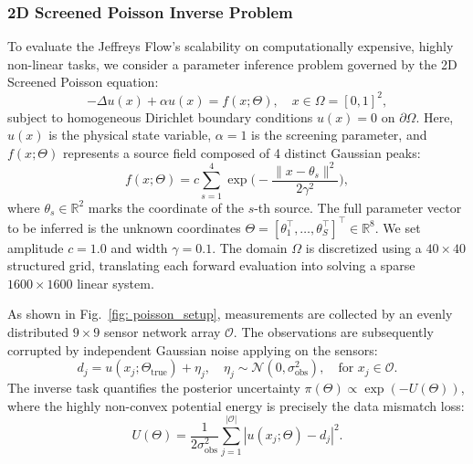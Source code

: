 \documentclass[%
 reprint,
 amsmath,amssymb,
 aps,
 pre,
]{revtex4-2}
\begin{document}
\subsubsection*{2D Screened Poisson Inverse Problem}

To evaluate the Jeffreys Flow's scalability on computationally expensive, highly non-linear tasks, we consider a parameter inference problem governed by the 2D Screened Poisson equation:
\begin{equation*}
	-\Delta u(x) + \alpha u(x) = f(x; \Theta), \quad x \in \Omega = [0, 1]^2,
\end{equation*}
subject to homogeneous Dirichlet boundary conditions $u(x) = 0$ on $\partial\Omega$. Here, $u(x)$ is the physical state variable, $\alpha=1$ is the screening parameter, and $f(x; \Theta)$ represents a source field composed of 4 distinct Gaussian peaks:
\begin{equation*}
	f(x; \Theta) = c \sum_{s=1}^4 \exp \bigg( -\frac{\|x - \theta_s\|^2}{2\gamma^2} \bigg),
\end{equation*}
where $\theta_s \in \mathbb{R}^2$ marks the coordinate of the $s$-th source. The full parameter vector to be inferred is the unknown coordinates $\Theta = [\theta_1^\top, \ldots, \theta_S^\top]^\top \in \mathbb{R}^8$. We set amplitude $c = 1.0$ and width $\gamma = 0.1$. The domain $\Omega$ is discretized using a $40 \times 40$ structured grid, translating each forward evaluation into solving a sparse $1600 \times 1600$ linear system.

As shown in Fig.~\ref{fig: poisson_setup}, measurements are collected by an evenly distributed $9 \times 9$ sensor network array $\mathcal{O}$. The observations are subsequently corrupted by independent Gaussian noise applying on the sensors:
\begin{equation*}
	d_j = u(x_j; \Theta_{\text{true}}) + \eta_j, \quad \eta_j \sim \mathcal{N}(0, \sigma_{\text{obs}}^2), \quad \text{for } x_j \in \mathcal{O}.
\end{equation*}
The inverse task quantifies the posterior uncertainty $\pi(\Theta) \propto \exp(-U(\Theta))$, where the highly non-convex potential energy is precisely the data mismatch loss:
\begin{equation*}
	U(\Theta) = \frac{1}{2\sigma_{\text{obs}}^2} \sum_{j=1}^{|\mathcal{O}|} |u(x_j; \Theta) - d_j|^2.
\end{equation*}
\end{document}
